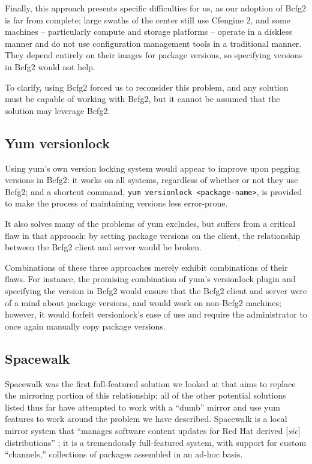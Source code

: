 Finally, this approach presents specific difficulties for us, as our
adoption of Bcfg2 is far from complete; large swaths of the center
still use Cfengine 2, and some machines -- particularly compute and
storage platforms -- operate in a diskless manner and do not use
configuration management tools in a traditional manner.  They depend
entirely on their images for package versions, so specifying versions
in Bcfg2 would not help.

To clarify, using Bcfg2 forced us to reconsider this problem, and any
solution must be capable of working with Bcfg2, but it cannot be
assumed that the solution may leverage Bcfg2.

\subsection{Yum versionlock}

Using yum's own version locking system would appear to improve upon
pegging versions in Bcfg2: it works on all systems, regardless of
whether or not they use Bcfg2; and a shortcut command, \texttt{yum
  versionlock <package-name>}, is provided to make the process of
maintaining versions less error-prone.

It also solves many of the problems of yum excludes, but suffers from
a critical flaw in that approach: by setting package versions on the
client, the relationship between the Bcfg2 client and server would be
broken.

Combinations of these three approaches merely exhibit combinations of
their flaws.  For instance, the promising combination of yum's
versionlock plugin and specifying the version in Bcfg2 would ensure
that the Bcfg2 client and server were of a mind about package
versions, and would work on non-Bcfg2 machines; however, it would
forfeit versionlock's ease of use and require the administrator to
once again manually copy package versions.

\subsection{Spacewalk}

Spacewalk was the first full-featured solution we looked at that aims
to replace the mirroring portion of this relationship; all of the
other potential solutions listed thus far have attempted to work with
a ``dumb'' mirror and use yum features to work around the problem we
have described.  Spacewalk is a local mirror system that ``manages
software content updates for Red Hat derived [\emph{sic}] distributions''
\cite{RH10}; it is a tremendously full-featured system, with support
for custom ``channels,'' collections of packages assembled in an
ad-hoc basis.

